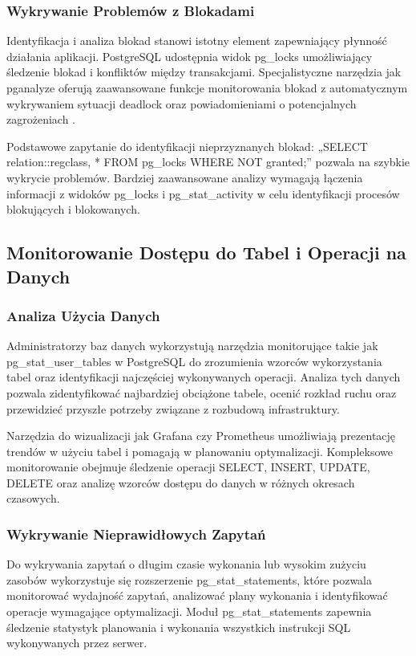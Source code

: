 \documentclass[letterpaper,10pt,polish]{sphinxmanual}
\begin{document}
\subsubsection{Wykrywanie      Problemów       z       Blokadami}
\label{\detokenize{rozdzial2/repo-wspolne/index:wykrywanie-problemow-z-blokadami}}
\sphinxAtStartPar
Identyfikacja i analiza blokad stanowi istotny element zapewniający płynność działania aplikacji. PostgreSQL udostępnia widok pg\_locks umożliwiający śledzenie blokad i konfliktów między transakcjami. Specjalistyczne narzędzia jak pganalyze oferują zaawansowane funkcje monitorowania blokad z automatycznym wykrywaniem sytuacji deadlock oraz powiadomieniami o potencjalnych zagrożeniach .

\sphinxAtStartPar
Podstawowe zapytanie do identyfikacji nieprzyznanych blokad: „SELECT relation::regclass, * FROM pg\_locks WHERE NOT granted;” pozwala na szybkie wykrycie problemów. Bardziej zaawansowane analizy wymagają łączenia informacji z widoków pg\_locks i pg\_stat\_activity w celu identyfikacji procesów blokujących i blokowanych.


\subsection{Monitorowanie   Dostępu do      Tabel   i       Operacji        na      Danych}
\label{\detokenize{rozdzial2/repo-wspolne/index:monitorowanie-dostepu-do-tabel-i-operacji-na-danych}}

\subsubsection{Analiza Użycia  Danych}
\label{\detokenize{rozdzial2/repo-wspolne/index:analiza-uzycia-danych}}
\sphinxAtStartPar
Administratorzy baz danych wykorzystują narzędzia monitorujące takie jak pg\_stat\_user\_tables w PostgreSQL do zrozumienia wzorców wykorzystania tabel oraz identyfikacji najczęściej wykonywanych operacji. Analiza tych danych pozwala zidentyfikować najbardziej obciążone tabele, ocenić rozkład ruchu oraz przewidzieć przyszłe potrzeby związane z rozbudową infrastruktury.

\sphinxAtStartPar
Narzędzia do wizualizacji jak Grafana czy Prometheus umożliwiają prezentację trendów w użyciu tabel i pomagają w planowaniu optymalizacji. Kompleksowe monitorowanie obejmuje śledzenie operacji SELECT, INSERT, UPDATE, DELETE oraz analizę wzorców dostępu do danych w różnych okresach czasowych.


\subsubsection{Wykrywanie Nieprawidłowych Zapytań}
\label{\detokenize{rozdzial2/repo-wspolne/index:wykrywanie-nieprawidlowych-zapytan}}
\sphinxAtStartPar
Do wykrywania zapytań o długim czasie wykonania lub wysokim zużyciu zasobów wykorzystuje się rozszerzenie pg\_stat\_statements, które pozwala monitorować wydajność zapytań, analizować plany wykonania i identyfikować operacje wymagające optymalizacji. Moduł pg\_stat\_statements zapewnia śledzenie statystyk planowania i wykonania wszystkich instrukcji SQL wykonywanych przez serwer.
\end{document}
